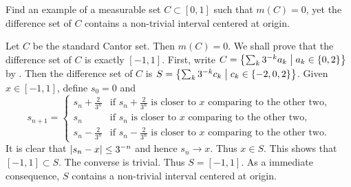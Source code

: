 \begin{problem}
    Find an example of a measurable set $C\subset[0,1]$ such 
    that $m(C)=0$, yet the difference set of $C$ contains a 
    non-trivial interval centered at origin.
\end{problem}
\begin{pf}
    Let $C$ be the standard Cantor set. Then $m(C)=0$. We 
    shall prove that the difference set of $C$ is exactly 
    $[-1,1]$. First, write $C=\left\{ \sum_k 3^{-k}a_k \;\middle\vert\; a_k\in\left\{ {0,2} \right\} \right\}$ by . Then the difference 
    set of $C$ is $S = \left\{ \sum_k 3^{-k}c_k \;\middle\vert\; c_k\in\left\{ {-2,0,2} \right\} \right\}$. Given $x\in[-1,1]$, define 
    $s_0 = 0$ and 
    \[
        s_{n+1} = \begin{cases*}
            s_n+\frac{2}{3^n} & \text{if $s_n+\frac{2}{3^n}$ 
            is closer to $x$ comparing to the other two,}\\ 
            s_n & \text{if $s_n$ is closer to $x$ comparing 
            to the other two,}\\ 
            s_n-\frac{2}{3^n} & \text{if $s_n-\frac{2}{3^n}$ 
            is closer to $x$ comparing to the other two.}
        \end{cases*}
    \]
    It is clear that $\left\lvert {s_n-x} \right\rvert\leq 3^{-n}$ and hence 
    $s_n\to x$. Thus $x\in S$. This shows that $[-1,1]\subset 
    S$. The converse is trivial. Thus $S = [-1,1]$. As a 
    immediate consequence, $S$ contains a non-trivial 
    interval centered at origin.
\end{pf}

